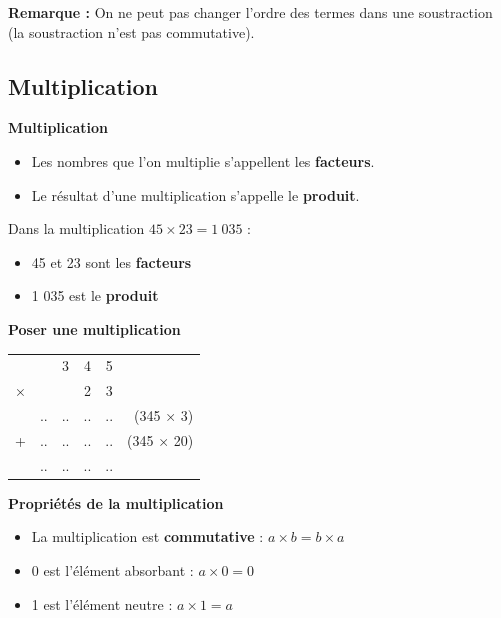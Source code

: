 \textbf{Remarque :} On ne peut pas changer l'ordre des termes dans une soustraction (la soustraction n'est pas commutative).

\subsection{Multiplication}

\begin{definitionbox}
	\textbf{Multiplication}
	\begin{itemize}[label = \textbullet]
		\item Les nombres que l'on multiplie s'appellent les \textbf{facteurs}.
		\item Le résultat d'une multiplication s'appelle le \textbf{produit}.
	\end{itemize}
\end{definitionbox}

\begin{examplebox}
	Dans la multiplication $45 \times 23 = 1~035$ :
	\begin{itemize}[label = \textbullet]
		\item 45 et 23 sont les \textbf{facteurs}
		\item 1 035 est le \textbf{produit}
	\end{itemize}
\end{examplebox}

\begin{methodebox}
	\textbf{Poser une multiplication}
	
	\begin{center}
		\begin{tabular}{cccccr}
			&   & 3 & 4 & 5 &   \\
			× &   &   & 2 & 3 &   \\
			\hline
			& .. & .. & .. & .. & \small{(345 × 3)} \\
			+ & .. & .. & .. & .. & \small{(345 × 20)} \\
			\hline
			& .. & .. & .. & .. &   \\
		\end{tabular}
	\end{center}
\end{methodebox}

\begin{proprietebox}
	\textbf{Propriétés de la multiplication}
	\begin{itemize}[label = \textbullet]
		\item La multiplication est \textbf{commutative} : $a \times b = b \times a$
		\item 0 est l'élément absorbant : $a \times 0 = 0$
		\item 1 est l'élément neutre : $a \times 1 = a$
	\end{itemize}
\end{proprietebox}

